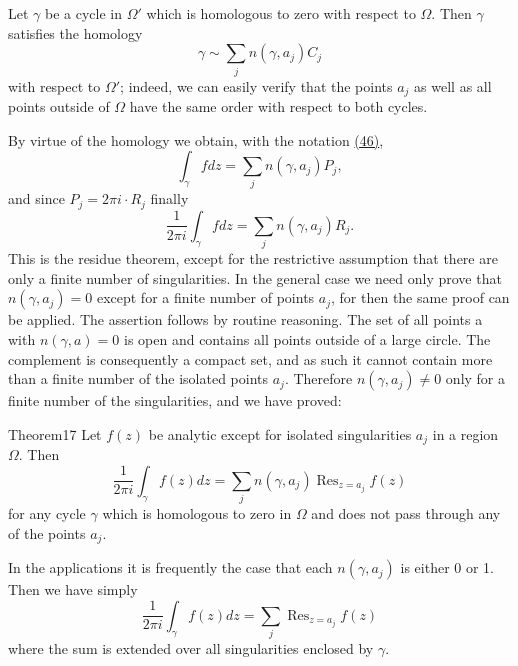 Let $\gamma$ be a cycle in $\Omega'$ which is homologous to zero with respect to $\Omega$. Then $\gamma$ satisfies the homology
\begin{equation*}
\gamma \sim \sum_ {j} n (\gamma , a _ {j}) C _ {j}
\end{equation*}
with respect to $\Omega'$; indeed, we can easily verify that the points $a_{j}$ as well as all points outside of $\Omega$ have the same order with respect to both cycles.


By virtue of the homology we obtain, with the notation \hyperref[eq:4.46]{(46)},
\begin{equation*}
\int_ {\gamma} f d z = \sum_ {j} n (\gamma , a _ {j}) P _ {j},
\end{equation*}
and since $P_{j} = 2\pi i \cdot R_{j}$ finally
\begin{equation*}
\frac {1}{2 \pi i} \int_ {\gamma} f d z = \sum_ {j} n (\gamma , a _ {j}) R _ {j}.
\end{equation*}
This is the residue theorem, except for the restrictive assumption that there are only a finite number of singularities. In the general case we need only prove that $n(\gamma,a_{j})=0$ except for a finite number of points $a_{j}$, for then the same proof can be applied. The assertion follows by routine reasoning. The set of all points a with $n(\gamma,a)=0$ is open and contains all points outside of a large circle. The complement is consequently a compact set, and as such it cannot contain more than a finite number of the isolated points $a_{j}$. Therefore $n(\gamma,a_{j})\neq0$ only for a finite number of the singularities, and we have proved:

\begin{originalstatement}{Theorem}{17}\label{thm:4.17}
Let $f(z)$ be analytic except for isolated singularities $a_j$ in a region $\Omega$. Then
\begin{equation*}
\frac {1}{2 \pi i} \int_ {\gamma} f (z) d z = \sum_ {j} n (\gamma , a _ {j}) \operatorname{Res} _ {z = a _ {j}} f (z)\tag{47}\label{eq:4.47}
\end{equation*}
for any cycle $\gamma$ which is homologous to zero in $\Omega$ and does not pass through any of the points $a_{j}$.

\end{originalstatement}
In the applications it is frequently the case that each $n(\gamma, a_{j})$ is either 0 or 1. Then we have simply
\begin{equation*}
\frac {1}{2 \pi i} \int_ {\gamma} f (z) d z = \sum_ {j} \operatorname{Res} _ {z = a _ {j}} f (z)
\end{equation*}
where the sum is extended over all singularities enclosed by $\gamma$.

